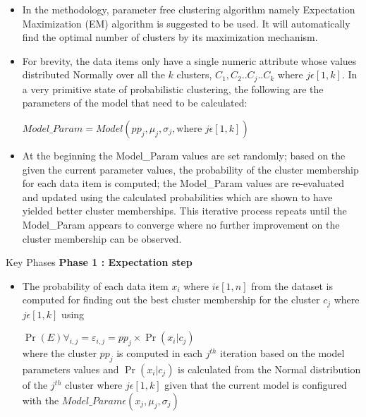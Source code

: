 \documentclass{beamer}
\providecommand{\pr}[1]{\ensuremath{\Pr\left(#1\right)}}
\providecommand{\pr}[1]{\ensuremath{\Pr\left(#1\right)}}
\begin{document}
\begin{frame}
    \begin{itemize}
        \item In the methodology, parameter free clustering algorithm 
namely Expectation Maximization (EM) algorithm is 
suggested to be used. It will automatically find the optimal 
number of clusters by its maximization mechanism. 
\item  For brevity, the data items only have a 
single numeric attribute whose values distributed Normally 
over all the $k$ clusters, $C_1, C_2 .. C_j.. C_k$
 where $j\epsilon[1,k]$. In a very primitive state of probabilistic clustering, the following are the parameters of the model that need to be calculated: 
 \begin{block}
 $Model\_Param = Model(pp_j, \mu_j, \sigma_j, \text{where } j\epsilon[1,k]) $
 \end{block}
 \item At the beginning the 
Model\_Param values are set randomly; based on the given 
the current parameter values, the probability of the cluster 
membership for each data item is computed; the 
Model\_Param values are re-evaluated and updated using the 
calculated probabilities which are shown to have yielded 
better cluster memberships. This iterative process repeats 
until the Model\_Param appears to converge where no further 
improvement on the cluster membership can be observed. 
    \end{itemize}
\end{frame}

\begin{frame}{Key Phases}
\textbf{Phase 1 : Expectation step}\\
\begin{itemize}
    \item The probability of each data item $x_i$
 where $i\epsilon [1,n]$ 
from the dataset is computed for finding out the best cluster 
membership for the cluster $c_j$
 where $j\epsilon[1,k]$ using
 \begin{block}
 $\pr{E}\forall_{i,j} = \varepsilon_{i,j} = pp_j \times \pr{x_i|c_j}$\\
 where the cluster $pp_j$ is computed in each $j^{th}$ iteration based on the model parameters values and $\pr{x_i|c_j}$ is calculated from the Normal distribution 
of the $j^{th}$ cluster where $j\epsilon[1,k]$ given that the current model is 
configured with the $Model\_Param\epsilon(x_j, \mu_j, \sigma_j)$
 \end{block}
\end{itemize}
\end{frame}
\end{document}
